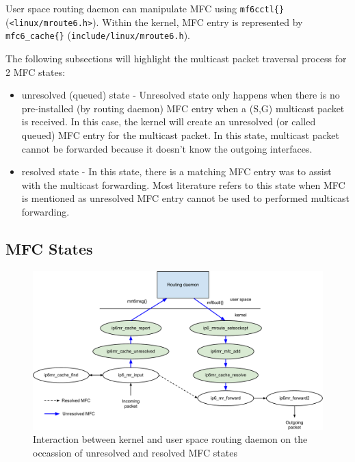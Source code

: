 \documentclass{article}
\begin{document}
User space routing daemon can manipulate MFC using \texttt{mf6cctl\{\}}
(\texttt{<linux/mroute6.h>}). Within the kernel, MFC entry is represented by
\texttt{mfc6\_cache\{\}} (\texttt{include/linux/mroute6.h}).

The following subsections will highlight the multicast packet traversal process
for 2 MFC states:

\begin{itemize}
  \item unresolved (queued) state - Unresolved state only happens when there is
  no pre-installed (by routing daemon) MFC entry when a (S,G) multicast packet
  is received. In this case, the kernel will create an unresolved (or called
  queued) MFC entry for the multicast packet. In this state, multicast packet
  cannot be forwarded because it doesn't know the outgoing interfaces.
  \item resolved state - In this state, there is a matching MFC entry was to assist
  with the multicast forwarding. Most literature refers to this state when MFC
  is mentioned as unresolved MFC entry cannot be used to performed multicast
  forwarding.
\end{itemize}

 
\subsection{MFC States}

\begin{figure}[h]
  \begin{center}
    \includegraphics[width=\textwidth]{mcast-mfc}
    \caption{Interaction between kernel and user space routing daemon on the
    occassion of unresolved and resolved MFC states}
    \label{fig:mcast-unresolved}
  \end{center}
\end{figure}
\end{document}
